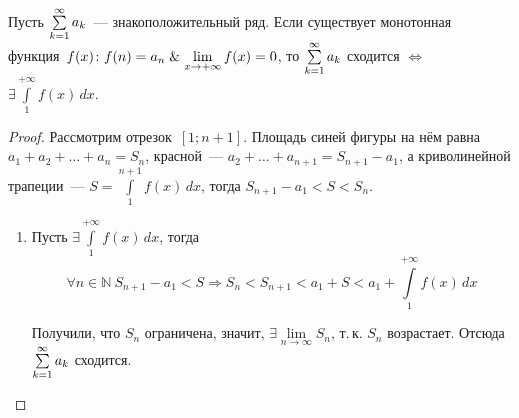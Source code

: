 \begin{theorem}
Пусть $\series a_k$~--- знакоположительный ряд.
Если существует монотонная функция~$f(x) \colon f(n) = a_n \mathrel{\&} \lim\limits_{x \to +\infty} f(x) = 0$, то $\series a_k$ сходится $\Leftrightarrow$ $\exists \int\limits_1^{+\infty} f(x)\,dx$.
\end{theorem}
\begin{proof}
Рассмотрим отрезок~$[1; n + 1]$.
Площадь синей фигуры на нём равна $a_1 + a_2 + \ldots + a_n = S_n$, красной~--- $a_2 + \ldots + a_{n+1} = S_{n+1} - a_1$, а криволинейной трапеции~--- $S = \int\limits_1^{n+1} f(x)\,dx$, тогда $S_{n+1} - a_1 < S < S_n$.
\begin{enumerate}
	\item \begin{minipage}[t]{105mm}\noindent
	Пусть $\exists \int\limits_1^{+\infty} f(x)\,dx$, тогда
	\begin{equation*}
	\forall n \in \mathbb N \ S_{n+1} - a_1 < S \Rightarrow
	S_n < S_{n+1} < a_1 + S < a_1 + \int\limits_1^{+\infty} f(x)\,dx
	\end{equation*}
	
	Получили, что $S_n$ ограничена, значит, $\exists \lim\limits_{n \to \infty} S_n$, т.\,к. $S_n$ возрастает.
	Отсюда $\series a_k$ сходится.
	\end{minipage}
	\hfill
	\begin{minipage}[t]{68mm}\noindent
	\begin{flushright}
\end{flushright}
\end{minipage}
\end{enumerate}
\end{proof}
